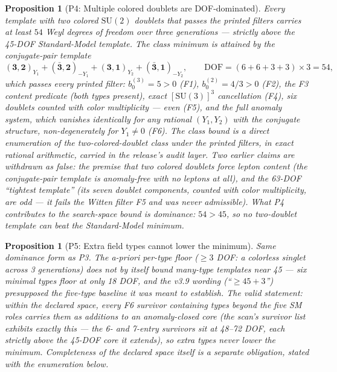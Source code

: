 \documentclass[11pt]{article}
\newtheorem{proposition}[theorem]{Proposition}
\theoremstyle{definition}
\newcommand{\SU}{\mathrm{SU}}
\begin{document}
\begin{proposition}[P4: Multiple colored doublets are DOF-dominated]
\label{prop:P4}
Every template with two colored $\SU(2)$ doublets that passes the
printed filters carries at least $54$ Weyl degrees of freedom over
three generations --- strictly above the 45-DOF Standard-Model
template.  The class minimum is attained by the conjugate-pair
template
\[
(\mathbf{3},\mathbf{2})_{Y_1} + (\bar{\mathbf{3}},\mathbf{2})_{-Y_1} +
(\mathbf{3},\mathbf{1})_{Y_2} + (\bar{\mathbf{3}},\mathbf{1})_{-Y_2},
\qquad \mathrm{DOF} = (6+6+3+3) \times 3 = 54,
\]
which passes every printed filter: $b_0^{(3)} = 5 > 0$ (F1),
$b_0^{(2)} = 4/3 > 0$ (F2), the F3 content predicate (both types
present), exact $[\SU(3)]^3$ cancellation (F4), six doublets counted
with color multiplicity --- even (F5), and the full anomaly system,
which vanishes identically for \emph{any} rational $(Y_1, Y_2)$ with
the conjugate structure, non-degenerately for $Y_1 \neq 0$ (F6).  The
class bound is a direct enumeration of the two-colored-doublet class
under the printed filters, in exact rational arithmetic, carried in
the release's audit layer.  Two earlier claims are withdrawn as
false: the premise that two colored doublets force lepton content
(the conjugate-pair template is anomaly-free with no leptons at all),
and the 63-DOF ``tightest template'' (its seven doublet components,
counted with color multiplicity, are odd --- it fails the Witten
filter F5 and was never admissible).  What P4 contributes to the
search-space bound is dominance: $54 > 45$, so no two-doublet
template can beat the Standard-Model minimum.
\end{proposition}

\begin{proposition}[P5: Extra field types cannot lower the minimum]
\label{prop:P5}
Same dominance form as P3.  The a-priori per-type floor ($\ge 3$ DOF:
a colorless singlet across 3 generations) does \emph{not} by itself
bound many-type templates near 45 --- six minimal types floor at only
18 DOF, and the v3.9 wording (``$\ge 45 + 3$'') presupposed the
five-type baseline it was meant to establish.  The valid statement:
within the declared space, every F6 survivor containing types beyond
the five SM roles carries them as additions to an anomaly-closed core
(the scan's survivor list exhibits exactly this --- the 6- and 7-entry
survivors sit at 48--72 DOF, each strictly above the 45-DOF core it
extends), so extra types never lower the minimum.  Completeness of the
declared space itself is a separate obligation, stated with the
enumeration below.
\end{proposition}
\end{document}
